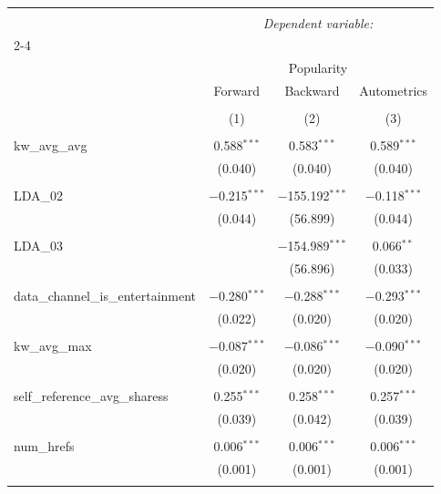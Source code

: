 
\begin{table}[!htbp] \centering 
  \caption{} 
  \label{} 
\begin{tabular}{@{\extracolsep{5pt}}lccc} 
\\[-1.8ex]\hline 
\hline \\[-1.8ex] 
 & \multicolumn{3}{c}{\textit{Dependent variable:}} \\ 
\cline{2-4} 
\\[-1.8ex] & \multicolumn{3}{c}{Popularity} \\ 
 & Forward & Backward & Autometrics \\ 
\\[-1.8ex] & (1) & (2) & (3)\\ 
\hline \\[-1.8ex] 
 kw\_avg\_avg & 0.588$^{***}$ & 0.583$^{***}$ & 0.589$^{***}$ \\ 
  & (0.040) & (0.040) & (0.040) \\ 
  & & & \\ 
 LDA\_02 & $-$0.215$^{***}$ & $-$155.192$^{***}$ & $-$0.118$^{***}$ \\ 
  & (0.044) & (56.899) & (0.044) \\ 
  & & & \\ 
 LDA\_03 &  & $-$154.989$^{***}$ & 0.066$^{**}$ \\ 
  &  & (56.896) & (0.033) \\ 
  & & & \\ 
 data\_channel\_is\_entertainment & $-$0.280$^{***}$ & $-$0.288$^{***}$ & $-$0.293$^{***}$ \\ 
  & (0.022) & (0.020) & (0.020) \\ 
  & & & \\ 
 kw\_avg\_max & $-$0.087$^{***}$ & $-$0.086$^{***}$ & $-$0.090$^{***}$ \\ 
  & (0.020) & (0.020) & (0.020) \\ 
  & & & \\ 
 self\_reference\_avg\_sharess & 0.255$^{***}$ & 0.258$^{***}$ & 0.257$^{***}$ \\ 
  & (0.039) & (0.042) & (0.039) \\ 
  & & & \\ 
 num\_hrefs & 0.006$^{***}$ & 0.006$^{***}$ & 0.006$^{***}$ \\ 
  & (0.001) & (0.001) & (0.001) \\ 
  & & & \\ 

\end{tabular}
\end{table}
